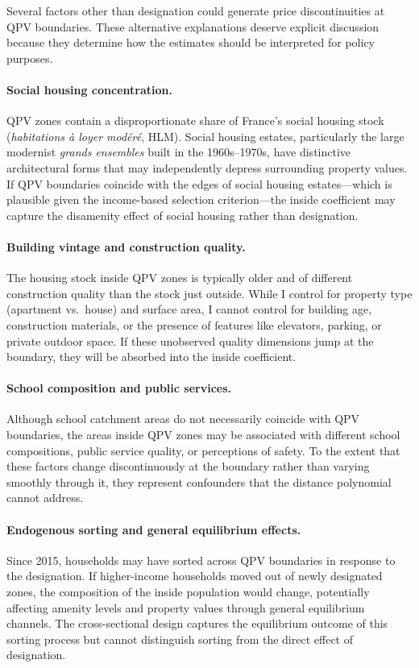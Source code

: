\documentclass[12pt]{article}
\begin{document}
Several factors other than designation could generate price discontinuities at QPV boundaries. These alternative explanations deserve explicit discussion because they determine how the estimates should be interpreted for policy purposes.

\paragraph{Social housing concentration.} QPV zones contain a disproportionate share of France's social housing stock (\textit{habitations \`{a} loyer mod\'{e}r\'{e}}, HLM). Social housing estates, particularly the large modernist \textit{grands ensembles} built in the 1960s--1970s, have distinctive architectural forms that may independently depress surrounding property values. If QPV boundaries coincide with the edges of social housing estates---which is plausible given the income-based selection criterion---the inside coefficient may capture the disamenity effect of social housing rather than designation.

\paragraph{Building vintage and construction quality.} The housing stock inside QPV zones is typically older and of different construction quality than the stock just outside. While I control for property type (apartment vs.\ house) and surface area, I cannot control for building age, construction materials, or the presence of features like elevators, parking, or private outdoor space. If these unobserved quality dimensions jump at the boundary, they will be absorbed into the inside coefficient.

\paragraph{School composition and public services.} Although school catchment areas do not necessarily coincide with QPV boundaries, the areas inside QPV zones may be associated with different school compositions, public service quality, or perceptions of safety. To the extent that these factors change discontinuously at the boundary rather than varying smoothly through it, they represent confounders that the distance polynomial cannot address.

\paragraph{Endogenous sorting and general equilibrium effects.} Since 2015, households may have sorted across QPV boundaries in response to the designation. If higher-income households moved out of newly designated zones, the composition of the inside population would change, potentially affecting amenity levels and property values through general equilibrium channels. The cross-sectional design captures the equilibrium outcome of this sorting process but cannot distinguish sorting from the direct effect of designation.
\end{document}
